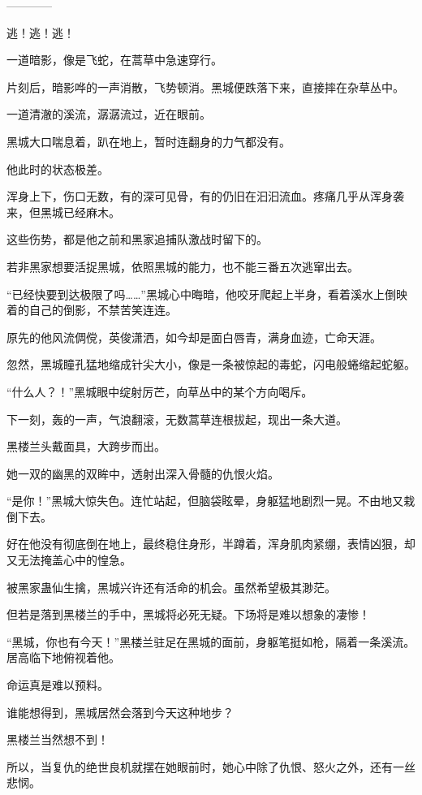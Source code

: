 
\begin{this_body}

------------

逃！逃！逃！

一道暗影，像是飞蛇，在蒿草中急速穿行。

片刻后，暗影哗的一声消散，飞势顿消。黑城便跌落下来，直接摔在杂草丛中。

一道清澈的溪流，潺潺流过，近在眼前。

黑城大口喘息着，趴在地上，暂时连翻身的力气都没有。

他此时的状态极差。

浑身上下，伤口无数，有的深可见骨，有的仍旧在汩汩流血。疼痛几乎从浑身袭来，但黑城已经麻木。

这些伤势，都是他之前和黑家追捕队激战时留下的。

若非黑家想要活捉黑城，依照黑城的能力，也不能三番五次逃窜出去。

“已经快要到达极限了吗……”黑城心中晦暗，他咬牙爬起上半身，看着溪水上倒映着的自己的倒影，不禁苦笑连连。

原先的他风流倜傥，英俊潇洒，如今却是面白唇青，满身血迹，亡命天涯。

忽然，黑城瞳孔猛地缩成针尖大小，像是一条被惊起的毒蛇，闪电般蜷缩起蛇躯。

“什么人？！”黑城眼中绽射厉芒，向草丛中的某个方向喝斥。

下一刻，轰的一声，气浪翻滚，无数蒿草连根拔起，现出一条大道。

黑楼兰头戴面具，大跨步而出。

她一双的幽黑的双眸中，透射出深入骨髓的仇恨火焰。

“是你！”黑城大惊失色。连忙站起，但脑袋眩晕，身躯猛地剧烈一晃。不由地又栽倒下去。

好在他没有彻底倒在地上，最终稳住身形，半蹲着，浑身肌肉紧绷，表情凶狠，却又无法掩盖心中的惶急。

被黑家蛊仙生擒，黑城兴许还有活命的机会。虽然希望极其渺茫。

但若是落到黑楼兰的手中，黑城将必死无疑。下场将是难以想象的凄惨！

“黑城，你也有今天！”黑楼兰驻足在黑城的面前，身躯笔挺如枪，隔着一条溪流。居高临下地俯视着他。

命运真是难以预料。

谁能想得到，黑城居然会落到今天这种地步？

黑楼兰当然想不到！

所以，当复仇的绝世良机就摆在她眼前时，她心中除了仇恨、怒火之外，还有一丝悲悯。


\end{this_body}

